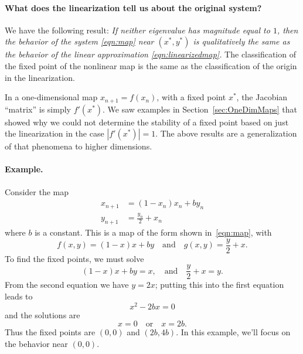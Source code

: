 \documentclass[reqno]{immbook}
\begin{document}
\paragraph{What does the linearization tell us about the original system?}
We have the following result:
\emph{If neither eigenvalue has magnitude equal to $1$,
then the behavior of the system \eqref{eqn:map}
near $(x^*,y^*)$ is qualitatively the same as the behavior of the
linear approximation \eqref{eqn:linearizedmap}.}
The classification of the fixed point of the nonlinear map
is the same as the classification of the origin in the linearization.

In a one-dimensional map $x_{n+1} = f(x_n)$, with a fixed
point $x^*$, the 
Jacobian ``matrix'' is simply $f'(x^*)$.  We saw examples
in Section~\ref{sec:OneDimMaps} that showed why we could not determine
the stability of a fixed point based on just the linearization
in the case $|f'(x^*)|=1$.  The above results are a generalization
of that phenomena to higher dimensions.


\paragraph{Example.}
Consider the map
\begin{equation}
\begin{split}
  x_{n+1} & = (1- x_n)x_n + b y_n \\
  y_{n+1} & = \frac{y_n}{2} + x_n
\end{split}
\label{eqn:linearizationexample}
\end{equation}
where $b$ is a constant.
This is a map of the form shown in~\eqref{eqn:map}, with
\begin{equation}
   f(x,y) = (1-x)x+by \quad \textrm{and} \quad g(x,y) = \frac{y}{2}+x.
\end{equation}
To find the fixed points, we must solve
\begin{equation}
   (1 - x)x + by = x, \quad \textrm{and} \quad \frac{y}{2}+x = y.
\end{equation}
From the second equation we have $y = 2x$; putting this into the first equation
leads to
\begin{equation}
   x^2-2bx = 0
\end{equation}
and the solutions are
\begin{equation}
  x = 0 \quad \textrm{or} \quad x= 2b.
\end{equation}
Thus the fixed points are
$(0,0)$ and $(2b,4b)$.
In this example, we'll focus on the behavior near $(0,0)$.
\end{document}
